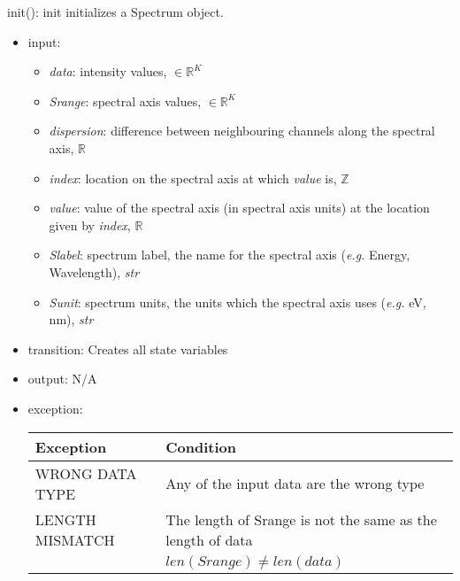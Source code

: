 \documentclass[12pt, titlepage]{article}
\begin{document}
\noindent init():
init initializes a Spectrum object.
\begin{itemize}
    \item input:
    \begin{itemize}
        \item \textit{data}: intensity values, $\in \mathbb{R}^K$
        \item \textit{Srange}: spectral axis values, $\in \mathbb{R}^K$
        \item \textit{dispersion}: difference  between neighbouring channels
        along the spectral axis,  $\mathbb{R}$
        \item \textit{index}: location on the spectral axis at which
        \textit{value} is, $\mathbb{Z}$
        \item \textit{value}: value of the spectral axis (in spectral axis
        units) at the location given by \textit{index}, $\mathbb{R}$
        \item \textit{Slabel}: spectrum label, the name for the spectral axis
        (\textit{e.g.} Energy, Wavelength), \textit{str}
        \item \textit{Sunit}: spectrum units, the units which the spectral axis
        uses (\textit{e.g.} \si{\electronvolt}, \si{\nano\metre}), \textit{str}
    \end{itemize}
    \item transition: Creates all state variables
    \item output: N/A 
    \item exception:
    \begin{center}
        \begin{tabular}{p{3cm} p{12cm}}
            \toprule[0.15em]
            \textbf{Exception} & \textbf{Condition}\\
            \midrule[0.1em]
            WRONG DATA TYPE & Any of the input data are the wrong type\\ 
            \midrule[0.05em]
            LENGTH MISMATCH & The length of Srange is not the same as the length of
            data\\
            & $len(Srange) \neq len(data)$\\
            \bottomrule[0.15em]
        \end{tabular}
    \end{center}
\end{itemize}
\end{document}

